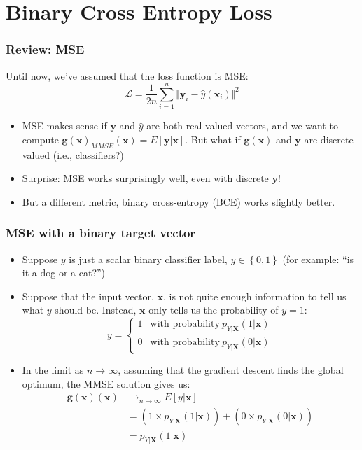 \section[BCE Loss]{Binary Cross Entropy  Loss}
\setcounter{subsection}{1}

\begin{frame}
  \frametitle{Review: MSE}
  
  Until now, we've assumed that the loss function is MSE:
  \[{\mathcal L} = \frac{1}{2n}\sum_{i=1}^n\Vert\mathbf{y}_{i}-\hat{y}(\mathbf{x}_i)\Vert^2 \]
  \begin{itemize}
  \item MSE makes sense if $\mathbf{y}$ and $\hat{y}$ are both
    real-valued vectors, and we want to compute
    $\mathbf{g}(\mathbf{x})_{MMSE}(\mathbf{x})=E\left[\mathbf{y}|\mathbf{x}\right]$.  But
    what if $\mathbf{g}(\mathbf{x})$ and $\mathbf{y}$ are discrete-valued (i.e.,
    classifiers?)
  \item Surprise: MSE works surprisingly well, even with
    discrete $\mathbf{y}$!
  \item But a different metric, binary cross-entropy (BCE) works
    slightly better.
  \end{itemize}
\end{frame}

\begin{frame}
  \frametitle{MSE with a binary target vector}
  \begin{itemize}
  \item Suppose $y$ is just a scalar binary classifier label,
    $y\in\left\{0,1\right\}$ (for example: ``is it a dog or a cat?'')
  \item Suppose that the input vector, $\mathbf{x}$, is not quite enough
    information to tell us what $y$ should be.  Instead, $\mathbf{x}$ only tells us
    the probability of $y=1$:
    \[
    y=\left\{\begin{array}{ll}
    1 & \mbox{with probability}~p_{Y|\mathbf{X}}\left(1|\mathbf{x}\right)\\
    0 & \mbox{with probability}~p_{Y|\mathbf{X}}\left(0|\mathbf{x}\right)
    \end{array}\right.
    \]
  \item In the limit as $n\rightarrow\infty$, assuming that the
    gradient descent finds the global optimum, the MMSE solution gives
    us:
    \begin{align*}
      \mathbf{g}(\mathbf{x})(\mathbf{x}) &\rightarrow_{n\rightarrow\infty}  E\left[y|\mathbf{x}\right]\\
      &= \left(1\times p_{Y|\mathbf{X}}\left(1|\mathbf{x}\right)\right) +
      \left(0\times p_{Y|\mathbf{X}}\left(0|\mathbf{x}\right)\right)\\
      &= p_{Y|\mathbf{X}}\left(1|\mathbf{x}\right)
    \end{align*}
  \end{itemize}
\end{frame}

